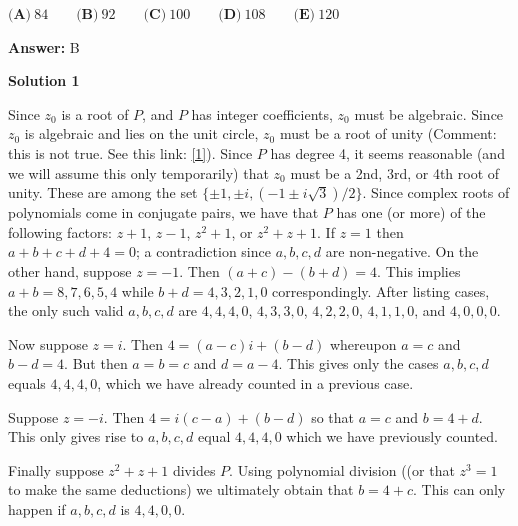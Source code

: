 \begin{enumerate}
 $\textbf{(A)}\ 84\qquad\textbf{(B)}\ 92\qquad\textbf{(C)}\ 100\qquad\textbf{(D)}\ 108\qquad\textbf{(E)}\ 120$

 \textbf{Answer: }B



\textbf{Solution 1}

Since $z_0$ is a root of $P$, and $P$ has integer coefficients, $z_0$ must be algebraic. Since $z_0$ is algebraic and lies on the unit circle, $z_0$ must be a root of unity (Comment: this is not true. See this link: \href{https://artofproblemsolving.comhttp://math.stackexchange.com/questions/4323/are-all-algebraic-integers-with-absolute-value-1-roots-of-unity}{[1]}). Since $P$ has degree 4, it seems reasonable (and we will assume this only temporarily) that $z_0$ must be a 2nd, 3rd, or 4th root of unity. These are among the set $\{\pm1,\pm i,(-1\pm i\sqrt{3})/2\}$. Since complex roots of polynomials come in conjugate pairs, we have that $P$ has one (or more) of the following factors: $z+1$, $z-1$, $z^2+1$, or $z^2+z+1$. If $z=1$ then $a+b+c+d+4=0$; a contradiction since $a,b,c,d$ are non-negative. On the other hand, suppose $z=-1$. Then $(a+c)-(b+d)=4$. This implies $a+b=8,7,6,5,4$ while $b+d=4,3,2,1,0$ correspondingly. After listing cases, the only such valid $a,b,c,d$ are $4,4,4,0$, $4,3,3,0$, $4,2,2,0$, $4,1,1,0$, and $4,0,0,0$. 

 Now suppose $z=i$. Then $4=(a-c)i+(b-d)$ whereupon $a=c$ and $b-d=4$. But then $a=b=c$ and $d=a-4$. This gives only the cases $a,b,c,d$ equals $4,4,4,0$, which we have already counted in a previous case.

 Suppose $z=-i$. Then $4=i(c-a)+(b-d)$ so that $a=c$ and $b=4+d$. This only gives rise to $a,b,c,d$ equal $4,4,4,0$ which we have previously counted. 

 Finally suppose $z^2+z+1$ divides $P$. Using polynomial division ((or that $z^3=1$ to make the same deductions) we ultimately obtain that $b=4+c$. This can only happen if $a,b,c,d$ is $4,4,0,0$. 


\end{enumerate}
